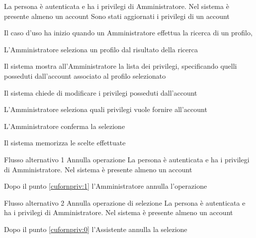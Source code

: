 {}
{La persona è autenticata e ha i privilegi di Amministratore. Nel sistema è presente almeno un account}
{Sono stati aggiornati i privilegi di un account}
{\begin{enumCU}
	\item Il caso d'uso ha inizio quando un Amministratore effettua la ricerca di un profilo, \label{cufornpriv:0}
	\item L'Amministratore seleziona un profilo dal risultato della ricerca
	\item Il sistema mostra all'Amministratore la lista dei privilegi, specificando quelli posseduti dall'account associato al profilo selezionato
	\item Il sistema chiede di modificare i privilegi posseduti dall'account
	\item L'Amministratore seleziona quali privilegi vuole fornire all'account\label{cufornpriv:1}
	\item L'Amministratore conferma la selezione
	\item Il sistema memorizza le scelte effettuate
\end{enumCU}}
%
{Flusso alternativo 1}%
{Annulla operazione}%
{La persona è autenticata e ha i privilegi di Amministratore. Nel sistema è presente almeno un account}%
{\postNulle}%
{\begin{enumCU}
		\item Dopo il punto \ref{cufornpriv:1} l'Amministratore annulla l'operazione
	\end{enumCU}}%
%	
{Flusso alternativo 2}%
{Annulla operazione di selezione}%
{La persona è autenticata e ha i privilegi di Amministratore. Nel sistema è presente almeno un account}%
{\postNulle}%
{\begin{enumCU}
		\item Dopo il punto \ref{cufornpriv:0} l'Assistente annulla la selezione
\end{enumCU}}%


